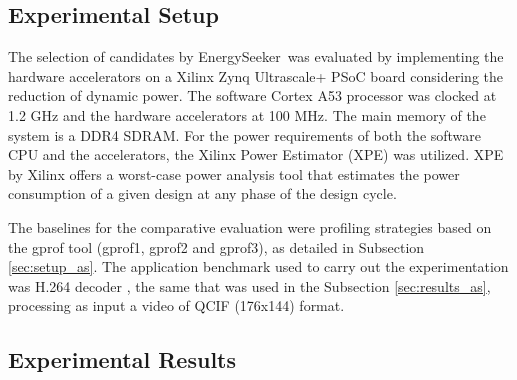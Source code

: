 \documentclass[]{usiinfthesis}
\newcommand{\eseeker}{{EnergySeeker}}
\begin{document}

\subsection{Experimental Setup}
\label{sec:results_set}

The selection of candidates by \eseeker\ was evaluated by implementing the 
hardware accelerators on a Xilinx Zynq Ultrascale+ PSoC board considering the reduction of 
dynamic power. The software 
Cortex A53 processor was clocked at 1.2 GHz and the hardware accelerators at 100 MHz.
The main memory of the system is a DDR4 SDRAM.
For the power requirements of both the software CPU and the accelerators, the Xilinx
Power Estimator (XPE) \cite{XpeSep19} was utilized. XPE by Xilinx offers a worst-case
power analysis tool that estimates the power consumption of a given design at any 
phase of the design cycle.\par

The baselines for the comparative evaluation were profiling strategies based on the 
gprof tool (gprof1, gprof2 and gprof3), as detailed in Subsection \ref{sec:setup_as}. 
The application benchmark used to carry out the experimentation was H.264 decoder 
\cite{LiuFeb16}, the same that was used in the Subsection \ref{sec:results_as}, processing 
as input a video of QCIF (176x144) format.


\subsection{Experimental Results}
\label{sec:results_es}

\end{document}
